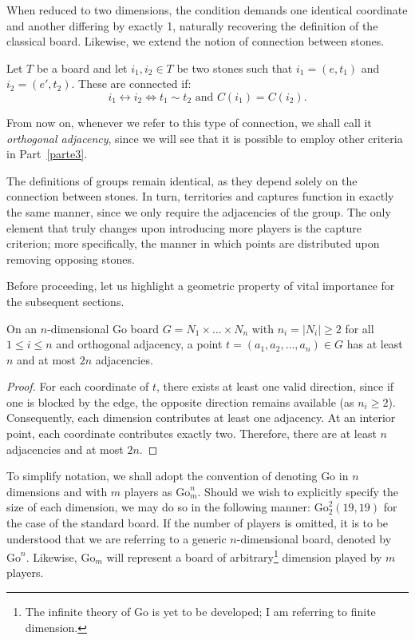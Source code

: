 When reduced to two dimensions, the condition demands one identical coordinate and another differing by exactly 1, naturally recovering the definition of the classical board. Likewise, we extend the notion of connection between stones.

\begin{definition}[Connection]
	Let $T$ be a board and let $i_1, i_2 \in T$ be two stones such that $i_1 = (e, t_1)$ and $i_2 = (e', t_2)$. These are connected if:
	$$i_1 \leftrightarrow i_2 \iff t_1 \sim t_2 \text{ and } C(i_1) = C(i_2).$$
\end{definition}
From now on, whenever we refer to this type of connection, we shall call it \textit{orthogonal adjacency}, since we will see that it is possible to employ other criteria in Part~\ref{parte3}.

The definitions of groups remain identical, as they depend solely on the connection between stones. In turn, territories and captures function in exactly the same manner, since we only require the adjacencies of the group. The only element that truly changes upon introducing more players is the capture criterion; more specifically, the manner in which points are distributed upon removing opposing stones.

Before proceeding, let us highlight a geometric property of vital importance for the subsequent sections.


\begin{lemma}\label{lem:2n}
	On an $n$-dimensional Go board $G = N_1 \times \dots \times N_n$ with $n_i = |N_i| \ge 2$ for all $1 \le i \le n$ and orthogonal adjacency, a point $t=(a_1,a_2,\dots,a_n) \in G$ has at least $n$ and at most $2n$ adjacencies.
\end{lemma}


\begin{proof}
	For each coordinate of $t$, there exists at least one valid direction, since if one is blocked by the edge, the opposite direction remains available (as $n_i \ge 2$). Consequently, each dimension contributes at least one adjacency. At an interior point, each coordinate contributes exactly two. Therefore, there are at least $n$ adjacencies and at most $2n$.
\end{proof}

To simplify notation, we shall adopt the convention of denoting Go in $n$ dimensions and with $m$ players as $\mathrm{Go}^n_m$. Should we wish to explicitly specify the size of each dimension, we may do so in the following manner: $\mathrm{Go}^2_2(19,19)$ for the case of the standard board. If the number of players is omitted, it is to be understood that we are referring to a generic $n$-dimensional board, denoted by $\mathrm{Go}^n$. Likewise, $\mathrm{Go}_m$ will represent a board of arbitrary\footnote{The infinite theory of Go is yet to be developed; I am referring to finite dimension.} dimension played by $m$ players.

